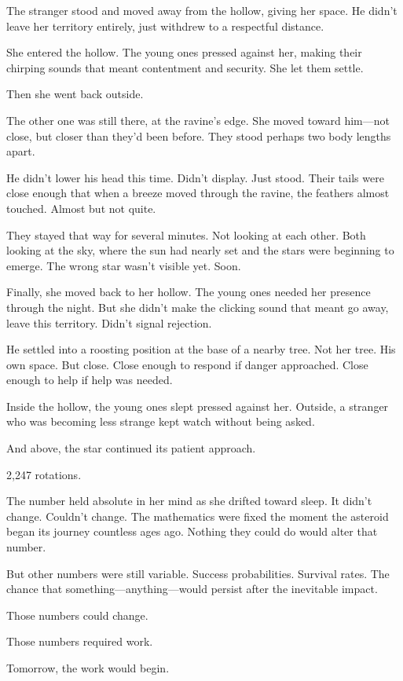 The stranger stood and moved away from the hollow, giving her space. He didn't leave her territory entirely, just withdrew to a respectful distance.

She entered the hollow. The young ones pressed against her, making their chirping sounds that meant contentment and security. She let them settle.

Then she went back outside.

The other one was still there, at the ravine's edge. She moved toward him—not close, but closer than they'd been before. They stood perhaps two body lengths apart.

He didn't lower his head this time. Didn't display. Just stood. Their tails were close enough that when a breeze moved through the ravine, the feathers almost touched. Almost but not quite.

They stayed that way for several minutes. Not looking at each other. Both looking at the sky, where the sun had nearly set and the stars were beginning to emerge. The wrong star wasn't visible yet. Soon.

Finally, she moved back to her hollow. The young ones needed her presence through the night. But she didn't make the clicking sound that meant go away, leave this territory. Didn't signal rejection.

He settled into a roosting position at the base of a nearby tree. Not her tree. His own space. But close. Close enough to respond if danger approached. Close enough to help if help was needed.

Inside the hollow, the young ones slept pressed against her. Outside, a stranger who was becoming less strange kept watch without being asked.

And above, the star continued its patient approach.

2,247 rotations.

The number held absolute in her mind as she drifted toward sleep. It didn't change. Couldn't change. The mathematics were fixed the moment the asteroid began its journey countless ages ago. Nothing they could do would alter that number.

But other numbers were still variable. Success probabilities. Survival rates. The chance that something—anything—would persist after the inevitable impact.

Those numbers could change.

Those numbers required work.

Tomorrow, the work would begin.

